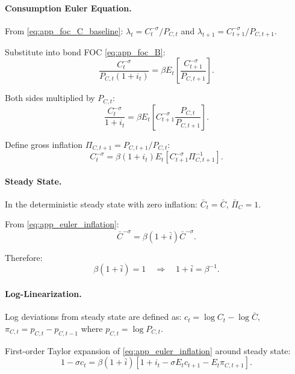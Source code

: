 \documentclass[12pt,a4paper]{article}
\begin{document}
\begin{appendices}
\paragraph{Consumption Euler Equation.}
From \eqref{eq:app_foc_C_baseline}: $\lambda_t = C_t^{-\sigma}/P_{C,t}$ and $\lambda_{t+1} = C_{t+1}^{-\sigma}/P_{C,t+1}$.

Substitute into bond FOC \eqref{eq:app_foc_B}:
\begin{equation}
	\frac{C_t^{-\sigma}}{P_{C,t}(1+i_t)} = \beta E_t \left[ \frac{C_{t+1}^{-\sigma}}{P_{C,t+1}} \right].
	\label{eq:app_euler_levels_baseline}
\end{equation}

Both sides multiplied by $P_{C,t}$:
\begin{equation}
	\frac{C_t^{-\sigma}}{1+i_t} = \beta E_t \left[ C_{t+1}^{-\sigma} \frac{P_{C,t}}{P_{C,t+1}} \right].
	\label{eq:app_euler_simplified}
\end{equation}

Define gross inflation $\Pi_{C,t+1} = P_{C,t+1}/P_{C,t}$:
\begin{equation}
	C_t^{-\sigma} = \beta(1+i_t) E_t \left[ C_{t+1}^{-\sigma} \Pi_{C,t+1}^{-1} \right].
	\label{eq:app_euler_inflation}
\end{equation}

\paragraph{Steady State.}
In the deterministic steady state with zero inflation: $\bar{C}_t = \bar{C}$, $\bar{\Pi}_C = 1$.

From \eqref{eq:app_euler_inflation}:
\begin{equation}
	\bar{C}^{-\sigma} = \beta(1+\bar{i}) \bar{C}^{-\sigma}.
\end{equation}

Therefore:
\begin{equation}
	\beta(1+\bar{i}) = 1 \quad \Rightarrow \quad 1+\bar{i} = \beta^{-1}.
	\label{eq:app_steady_state}
\end{equation}

\paragraph{Log-Linearization.}
Log deviations from steady state are defined as: $c_t = \log C_t - \log \bar{C}$, $\pi_{C,t} = p_{C,t} - p_{C,t-1}$ where $p_{C,t} = \log P_{C,t}$.

First-order Taylor expansion of \eqref{eq:app_euler_inflation} around steady state:
\begin{equation}
	1 - \sigma c_t = \beta(1+\bar{i})[1 + i_t - \sigma E_t c_{t+1} - E_t\pi_{C,t+1}].
\end{equation}


\end{appendices}
\end{document}
